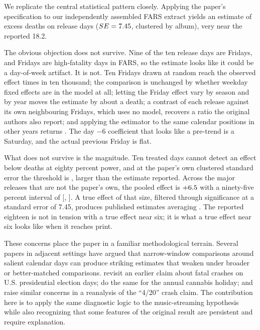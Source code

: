 \documentclass[11pt]{article}
\begin{document}
We replicate the central statistical pattern closely. Applying the paper's specification to our
independently assembled FARS extract yields an estimate of \numEffectRegression{} excess deaths on
release days ($SE = 7.45$, clustered by album), very near the reported 18.2.

The obvious objection does not survive. Nine of the ten release days are Fridays, and Fridays are
high-fatality days in FARS, so the estimate looks like it could be a day-of-week artifact. It is
not. Ten Fridays drawn at random reach the observed effect \numFridayPlaceboDraws{} times in ten
thousand; the comparison is unchanged by whether weekday fixed effects are in the model at all;
letting the Friday effect vary by season and by year moves the estimate by about a death; a
contrast of each release against its own neighbouring Fridays, which uses no model, recovers a
ratio the original authors also report; and applying the estimator to the same calendar positions
in other years returns \numEffectCalendarPlacebo{}. The day $-6$ coefficient that looks like a
pre-trend is a Saturday, and the actual previous Friday is flat.

What does not survive is the magnitude. Ten treated days cannot detect an effect below
\numMDEEighty{} deaths at eighty percent power, and at the paper's own clustered standard error the
threshold is \numMDEEightyClustered{}, larger than the estimate reported. Across the
\numNOutsidePaper{} major releases that are not the paper's own, the pooled effect is
$+6.5$ with a ninety-five percent interval of [\numCIOutsideLo,
\numCIOutsideHi]. A true effect of that size, filtered through significance at a standard error of
7.45, produces published estimates averaging \numMeanPublishedAtOutside{}. The reported eighteen is
not in tension with a true effect near six; it is what a true effect near six looks like when it
reaches print.

These concerns place the paper in a familiar methodological terrain. Several papers in adjacent settings have argued that narrow-window comparisons around salient calendar days can produce striking estimates that weaken under broader or better-matched comparisons. \citet{zhang2016election} revisit an earlier claim about fatal crashes on U.S. presidential election days; \citet{palayew2019cannabis} do the same for the annual cannabis holiday; and \citet{brown2018reexamining} raise similar concerns in a reanalysis of the ``4/20'' crash claim. The contribution here is to apply the same diagnostic logic to the music-streaming hypothesis while also recognizing that some features of the original result are persistent and require explanation.
\end{document}
